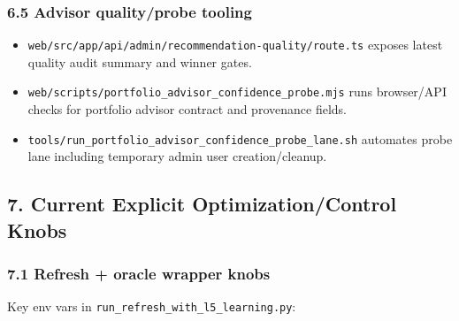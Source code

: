 \documentclass[
]{article}
\providecommand{\tightlist}{%
  \setlength{\itemsep}{0pt}\setlength{\parskip}{0pt}}
\begin{document}
\subsubsection{6.5 Advisor quality/probe
tooling}\label{65-advisor-qualityprobe-tooling}

\begin{itemize}
\tightlist
\item
  \texttt{web/src/app/api/admin/recommendation-quality/route.ts} exposes
  latest quality audit summary and winner gates.
\item
  \texttt{web/scripts/portfolio\_advisor\_confidence\_probe.mjs} runs
  browser/API checks for portfolio advisor contract and provenance
  fields.
\item
  \texttt{tools/run\_portfolio\_advisor\_confidence\_probe\_lane.sh}
  automates probe lane including temporary admin user creation/cleanup.
\end{itemize}

\subsection{7. Current Explicit Optimization/Control
Knobs}\label{7-current-explicit-optimizationcontrol-knobs}

\subsubsection{7.1 Refresh + oracle wrapper
knobs}\label{71-refresh--oracle-wrapper-knobs}

Key env vars in \texttt{run\_refresh\_with\_l5\_learning.py}:
\end{document}
